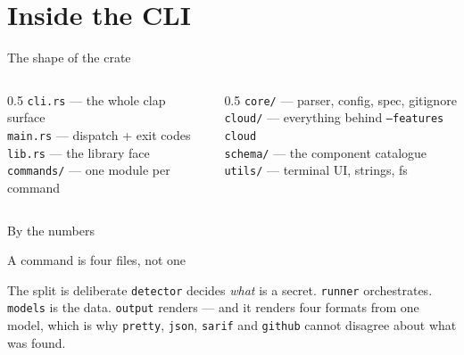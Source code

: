 \documentclass[aspectratio=169,10pt]{beamer}
\begin{document}
\section{Inside the CLI}

\begin{frame}[fragile]{The shape of the crate}

  \begin{columns}[T]
    \begin{column}{0.5\textwidth}
      {\footnotesize
      \texttt{cli.rs} --- the whole clap surface\\
      \texttt{main.rs} --- dispatch + exit codes\\
      \texttt{lib.rs} --- the library face\\
      \texttt{commands/} --- one module per command}
    \end{column}
    \begin{column}{0.5\textwidth}
      {\footnotesize
      \texttt{core/} --- parser, config, spec, gitignore\\
      \texttt{cloud/} --- everything behind \texttt{--features cloud}\\
      \texttt{schema/} --- the component catalogue\\
      \texttt{utils/} --- terminal UI, strings, fs}
    \end{column}
  \end{columns}
\end{frame}

\begin{frame}[fragile]{By the numbers}
\end{frame}

\begin{frame}[fragile]{A command is four files, not one}

  \begin{block}{The split is deliberate}
    \texttt{detector} decides \emph{what} is a secret. \texttt{runner}
    orchestrates. \texttt{models} is the data. \texttt{output} renders --- and
    it renders four formats from one model, which is why \texttt{pretty},
    \texttt{json}, \texttt{sarif} and \texttt{github} cannot disagree about what
    was found.
  \end{block}
\end{frame}
\end{document}
